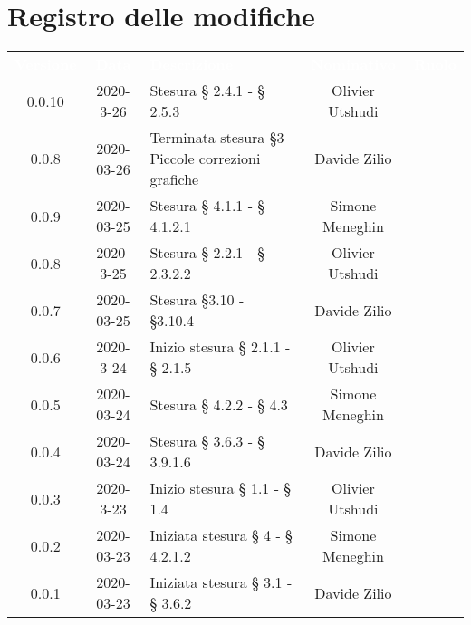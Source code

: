 \section*{Registro delle modifiche}
{
	\centering
	\begin{longtable}{ c c  C{4cm}  c  c }
		\textcolor{white}{\textbf{Versione}} & \textcolor{white}{\textbf{Data}} & \textcolor{white}{\textbf{Descrizione}} & \textcolor{white}{\textbf{Nominativo}} & \textcolor{white}{\textbf{Ruolo}}\\
		
		0.0.10 & 2020-3-26 & Stesura § 2.4.1 - § 2.5.3 & Olivier Utshudi &\reda{}\\
		0.0.8 & 2020-03-26 & Terminata stesura \S 3 \newline Piccole correzioni grafiche & Davide Zilio &\reda{}\\
		0.0.9 & 2020-03-25 & Stesura § 4.1.1 - § 4.1.2.1 & Simone Meneghin &\reda{}\\	
		
		0.0.8 & 2020-3-25 & Stesura § 2.2.1 - § 2.3.2.2 & Olivier Utshudi &\reda{}\\
		
		0.0.7 & 2020-03-25 & Stesura \S 3.10 - \S 3.10.4 & Davide Zilio & \reda{}\\
		
		0.0.6 & 2020-3-24 & Inizio stesura § 2.1.1 - § 2.1.5 & Olivier Utshudi &\reda{}\\

		0.0.5 & 2020-03-24 & Stesura § 4.2.2 - § 4.3 & Simone Meneghin &\reda{}\\		
		
		0.0.4 & 2020-03-24 & Stesura § 3.6.3 - § 3.9.1.6 & Davide Zilio &\reda{}\\
		
		0.0.3 & 2020-3-23 & Inizio stesura § 1.1 - § 1.4 & Olivier Utshudi &\reda{}\\
		
		0.0.2 & 2020-03-23 & Iniziata stesura § 4 - § 4.2.1.2 & Simone Meneghin &\reda{}\\
		
		0.0.1 & 2020-03-23 & Iniziata stesura § 3.1 - § 3.6.2 & Davide Zilio &\reda{}\\		
		
	\end{longtable}

}